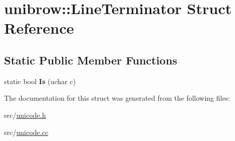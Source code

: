 \hypertarget{structunibrow_1_1_line_terminator}{}\section{unibrow\+:\+:Line\+Terminator Struct Reference}
\label{structunibrow_1_1_line_terminator}
\subsection*{Static Public Member Functions}
\begin{DoxyCompactItemize}
\item 
\hypertarget{structunibrow_1_1_line_terminator_a796904882c4db8a2e825de501309e58f}{}static bool {\bfseries Is} (uchar c)\label{structunibrow_1_1_line_terminator_a796904882c4db8a2e825de501309e58f}

\end{DoxyCompactItemize}


The documentation for this struct was generated from the following files\+:\begin{DoxyCompactItemize}
\item 
src/\hyperlink{unicode_8h}{unicode.\+h}\item 
src/\hyperlink{unicode_8cc}{unicode.\+cc}\end{DoxyCompactItemize}
